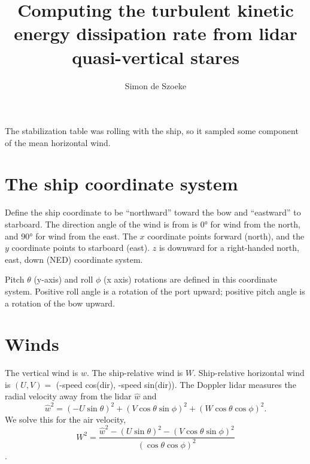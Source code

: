 \documentclass[12pt]{article}
\title{Computing the turbulent kinetic energy dissipation rate from lidar quasi-vertical
stares}
\author{Simon de Szoeke}
\begin{document}
\maketitle




The stabilization table was rolling with the ship, so it sampled some
component of the mean horizontal wind.

\section{The ship coordinate
system}\label{the-ship-coordinate-system}%

Define the ship coordinate to be ``northward'' toward the bow and
``eastward'' to starboard. The direction angle of the wind is from is 0° for wind
from the north, and 90° for wind from the east. The \(x\) coordinate points forward
(north), and the \(y\) coordinate points to
starboard (east). \(z\) is downward for a right-handed north, east, down (NED) coordinate system.

Pitch \(\theta\) (y-axis) and roll \(\phi\) (x axis) rotations are
defined in this coordinate system. Positive roll angle is a rotation of
the port upward; positive pitch angle is a rotation of the bow upward.

\section{Winds}\label{winds}%

The vertical wind is \(w\). The ship-relative wind is \(W\).
Ship-relative horizontal wind is 
$ (U, V) = $ (-speed cos(dir), -speed
sin(dir)).
The Doppler lidar measures the radial velocity away from the lidar \(\hat{w}\) and 
\[
\hat{w}^2 = (-U \sin\theta)^2 
+ (V \cos \theta \sin \phi)^2 
+ (W \cos \theta \cos \phi)^2.
\]
We solve this for the air
velocity, \[
W^2 = \frac{ \hat{w}^2 
- (U \sin\theta)^2 
- (V \cos\theta \sin\phi)^2 }
{(\cos\theta \cos\phi)^2}
\].
\end{document}
